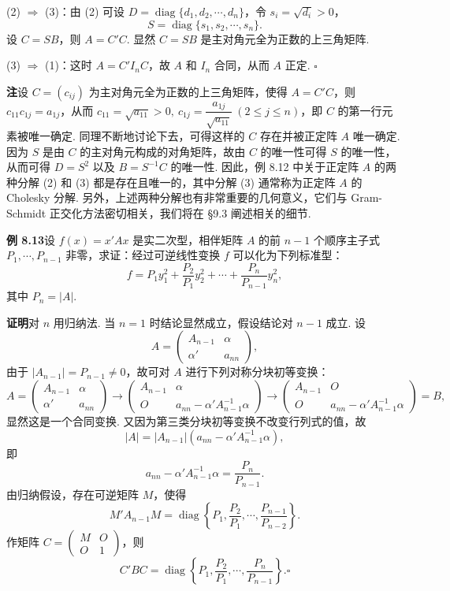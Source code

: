 \documentclass[UTF8,12pt,a4paper,fontset=fandol]{ctexart}
\begin{document}
(2) $\Rightarrow$ (3)：由 (2) 可设 $D=\operatorname{diag}\{d_1,d_2,\cdots,d_n\}$，令 $s_i=\sqrt{d_i}>0$，
\[
S=\operatorname{diag}\{s_1,s_2,\cdots,s_n\}.
\]
设 $C=SB$，则 $A=C'C$. 显然 $C=SB$ 是主对角元全为正数的上三角矩阵.

(3) $\Rightarrow$ (1)：这时 $A=C'I_nC$，故 $A$ 和 $I_n$ 合同，从而 $A$ 正定. $\ensuremath{\square}$

\noindent\textbf{注}\quad 设 $C=(c_{ij})$ 为主对角元全为正数的上三角矩阵，使得 $A=C'C$，则 $c_{11}c_{1j}=a_{1j}$，从而 $c_{11}=\sqrt{a_{11}}>0,\ c_{1j}=\dfrac{a_{1j}}{\sqrt{a_{11}}}\ (2\le j\le n)$，即 $C$ 的第一行元素被唯一确定. 同理不断地讨论下去，可得这样的 $C$ 存在并被正定阵 $A$ 唯一确定. 因为 $S$ 是由 $C$ 的主对角元构成的对角矩阵，故由 $C$ 的唯一性可得 $S$ 的唯一性，从而可得 $D=S^2$ 以及 $B=S^{-1}C$ 的唯一性. 因此，例 8.12 中关于正定阵 $A$ 的两种分解 (2) 和 (3) 都是存在且唯一的，其中分解 (3) 通常称为正定阵 $A$ 的 Cholesky 分解. 另外，上述两种分解也有非常重要的几何意义，它们与 Gram-Schmidt 正交化方法密切相关，我们将在 §9.3 阐述相关的细节.

\noindent\textbf{例 8.13}\quad 设 $f(x)=x'Ax$ 是实二次型，相伴矩阵 $A$ 的前 $n-1$ 个顺序主子式 $P_1,\cdots,P_{n-1}$ 非零，求证：经过可逆线性变换 $f$ 可以化为下列标准型：
\[
f=P_1y_1^2+\frac{P_2}{P_1}y_2^2+\cdots+\frac{P_n}{P_{n-1}}y_n^2,
\]
其中 $P_n=|A|$.

\noindent\textbf{证明}\quad 对 $n$ 用归纳法. 当 $n=1$ 时结论显然成立，假设结论对 $n-1$ 成立. 设
\[
A=\left(\begin{array}{cc}
A_{n-1} & \alpha\\
\alpha' & a_{nn}
\end{array}\right),
\]
由于 $|A_{n-1}|=P_{n-1}\ne 0$，故可对 $A$ 进行下列对称分块初等变换：
\[
A=\left(\begin{array}{cc}
A_{n-1} & \alpha\\
\alpha' & a_{nn}
\end{array}\right)
\to
\left(\begin{array}{cc}
A_{n-1} & \alpha\\
O & a_{nn}-\alpha'A_{n-1}^{-1}\alpha
\end{array}\right)
\to
\left(\begin{array}{cc}
A_{n-1} & O\\
O & a_{nn}-\alpha'A_{n-1}^{-1}\alpha
\end{array}\right)=B,
\]
显然这是一个合同变换. 又因为第三类分块初等变换不改变行列式的值，故
\[
|A|=|A_{n-1}|(a_{nn}-\alpha'A_{n-1}^{-1}\alpha),
\]
即
\[
a_{nn}-\alpha'A_{n-1}^{-1}\alpha=\frac{P_n}{P_{n-1}}.
\]
由归纳假设，存在可逆矩阵 $M$，使得
\[
M'A_{n-1}M=\operatorname{diag}\left\{P_1,\frac{P_2}{P_1},\cdots,\frac{P_{n-1}}{P_{n-2}}\right\}.
\]
作矩阵 $C=\left(\begin{array}{cc}M&O\\ O&1\end{array}\right)$，则
\[
C'BC=\operatorname{diag}\left\{P_1,\frac{P_2}{P_1},\cdots,\frac{P_n}{P_{n-1}}\right\}. \ensuremath{\square}
\]
\end{document}
